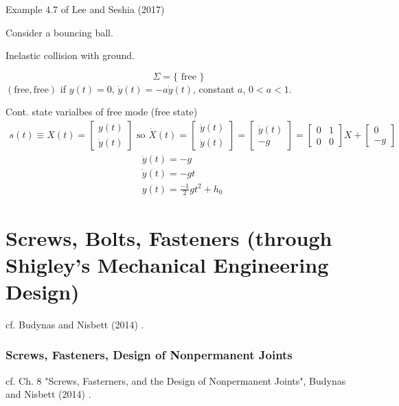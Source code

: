 \documentclass[10pt]{amsart}
\begin{document}
\begin{multicols*}{2}
Example 4.7 of Lee and Seshia (2017) \cite{LeSe2017}

Consider a bouncing ball.  

Inelastic collision with ground.  

\[
\Sigma = \lbrace \text{ free } \rbrace
\] 
$(\text{free},\text{free}) $ if $y(t) = 0 $, $\dot{y}(t) = -a\dot{y}(t)$, constant $a$, $0<a<1$. 

Cont. state varialbes of free mode (free state)
\[
\begin{gathered}
	s(t) \equiv X(t)  = \left[ \begin{matrix} y(t) \\ 
\dot{y}(t) \end{matrix} \right] \text{ so } \dot{X}(t) = \left[ \begin{matrix} \dot{y}(t) \\ \ddot{y}(t) \end{matrix} \right] = \left[ \begin{matrix} \dot{y}(t) \\ -g \end{matrix} \right] = \left[ \begin{matrix} 0 & 1 \\ 0 & 0 \end{matrix} \right] X + \left[ \begin{matrix} 0 \\ -g \end{matrix} \right] 
\end{gathered}
\]
\[
\begin{aligned}
	& \ddot{y}(t) = -g \\ 
	& \dot{y}(t) = -gt \\ 
	& y(t) = \frac{-1}{2} gt^2 + h_0  
\end{aligned}
\]





\part{Screws, Bolts, Fasteners (through Shigley's Mechanical Engineering Design)}

cf. Budynas and Nisbett (2014) \cite{BuNi2014}.  

\section{Screws, Fasteners, Design of Nonpermanent Joints}

cf. Ch. 8 "Screws, Fasterners, and the Design of Nonpermanent Joints", Budynas and Nisbett (2014) \cite{BuNi2014}.  


\end{multicols*}
\end{document}
